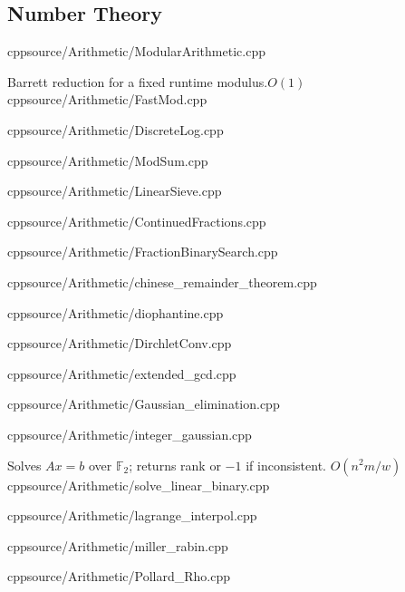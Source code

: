\documentclass[portrait, 8pt, a4paper, oneside, twocolumn]{extarticle}
\begin{document}
\subsection{Number Theory}


{cpp}{source/Arithmetic/ModularArithmetic.cpp}

{Barrett reduction for a fixed runtime modulus.}{$O(1)$}
{cpp}{source/Arithmetic/FastMod.cpp}

{cpp}{source/Arithmetic/DiscreteLog.cpp}

{cpp}{source/Arithmetic/ModSum.cpp}

{cpp}{source/Arithmetic/LinearSieve.cpp}

{cpp}{source/Arithmetic/ContinuedFractions.cpp}

{cpp}{source/Arithmetic/FractionBinarySearch.cpp}


{}{}
{cpp}{source/Arithmetic/chinese_remainder_theorem.cpp}

{}{}
{cpp}{source/Arithmetic/diophantine.cpp}

{}{}
{cpp}{source/Arithmetic/DirchletConv.cpp}

{}{}
{cpp}{source/Arithmetic/extended_gcd.cpp}

{}{}
{cpp}{source/Arithmetic/Gaussian_elimination.cpp}

{}{}
{cpp}{source/Arithmetic/integer_gaussian.cpp}

{Solves $Ax=b$ over $\mathbb F_2$; returns rank or $-1$ if inconsistent.}
{$O(n^2m / w)$}
{cpp}{source/Arithmetic/solve_linear_binary.cpp}

{}{}
{cpp}{source/Arithmetic/lagrange_interpol.cpp}

{}{}
{cpp}{source/Arithmetic/miller_rabin.cpp}

{}{}
{cpp}{source/Arithmetic/Pollard_Rho.cpp}
\end{document}
